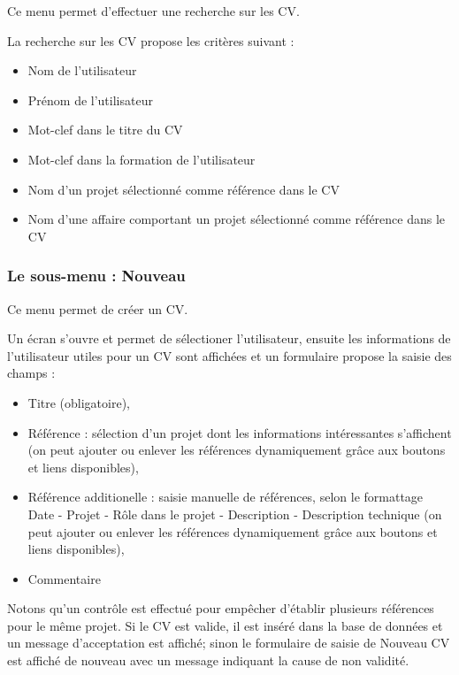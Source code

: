 Ce menu permet d'effectuer une recherche sur les CV.

La recherche sur les CV propose les critères suivant :

\begin{itemize}
\item Nom de l'utilisateur
\item Prénom de l'utilisateur
\item Mot-clef dans le titre du CV
\item Mot-clef dans la formation de l'utilisateur
\item Nom d'un projet sélectionné comme référence dans le CV
\item Nom d'une affaire comportant un projet sélectionné comme référence dans le CV
\end{itemize}
\vspace{0.3cm}

\subsubsection{Le sous-menu : Nouveau}

Ce menu permet de créer un CV.

Un écran s'ouvre et permet de sélectioner l'utilisateur, ensuite les informations de l'utilisateur utiles pour un CV sont affichées et un formulaire propose la saisie des champs :

\begin{itemize}
\item Titre (obligatoire),
\item Référence : sélection d'un projet dont les informations intéressantes s'affichent (on peut ajouter ou enlever les références dynamiquement grâce aux boutons et liens disponibles),
\item Référence additionelle : saisie manuelle de références, selon le formattage Date - Projet - Rôle dans le projet - Description - Description technique (on peut ajouter ou enlever les références dynamiquement grâce aux boutons et liens disponibles),
\item Commentaire
\end{itemize}
\vspace{0.3cm}

Notons qu'un contrôle est effectué pour empêcher d'établir plusieurs références pour le même projet.
Si le CV est valide, il est inséré dans la base de données et un message d'acceptation est affiché; sinon le formulaire de saisie de Nouveau CV est affiché de nouveau avec un message indiquant la cause de non validité.


